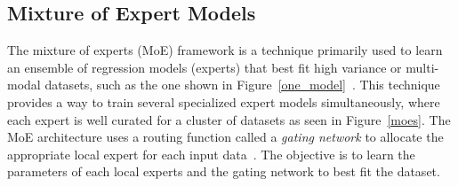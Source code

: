 \subsection{Mixture of Expert Models}
\label{ssec:mixture_of_experts}


The mixture of experts (MoE) framework is a technique primarily used to learn an
ensemble of regression models (experts) that best fit high variance or
multi-modal datasets, such as the one shown in
Figure~\ref{one_model}~\cite{bishop2006pattern}.
%
This technique provides a way to train several specialized expert models
simultaneously, where each expert is well curated for a cluster of datasets as
seen in Figure~\ref{moes}.
%
The MoE architecture uses a routing function called a \textit{gating network} to
allocate the appropriate local expert for each input
data~\cite{harkonen2022mixtures}.
%
The objective is to learn the parameters of each local experts and the gating
network to best fit the dataset.
%

